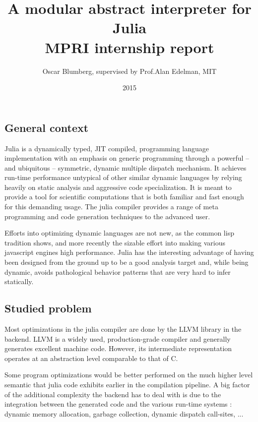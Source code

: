 \documentclass[11pt]{article}
\title{\vspace{-6ex}A modular abstract interpreter for Julia \\ MPRI internship report}
\author{Oscar Blumberg, supervised by Prof.\@ Alan Edelman, MIT}
\date{2015}
\begin{document}
\onehalfspacing
\maketitle

\thispagestyle{empty}
\vspace{1.5ex}
\subsection*{General context}

Julia\cite{julia-paper}\cite{julia-web} is a dynamically typed, JIT compiled, programming language implementation with an emphasis on generic programming through a powerful -- and ubiquitous -- symmetric, dynamic multiple dispatch mechanism. It achieves run-time performance untypical of other similar dynamic languages by relying heavily on static analysis and aggressive code specialization. It is meant to provide a tool for scientific computations that is both familiar and fast enough for this demanding usage. The julia compiler provides a range of meta programming and code generation techniques to the advanced user.

Efforts into optimizing dynamic languages are not new, as the common lisp tradition shows, and more recently the sizable effort into making various javascript engines high performance. Julia has the interesting advantage of having been designed from the ground up to be a good analysis target and, while being dynamic, avoids pathological behavior patterns that are very hard to infer statically.

\subsection*{Studied problem}

Most optimizations in the julia compiler are done by the LLVM library in the backend. LLVM is a widely used, production-grade compiler and generally generates excellent machine code. However, its intermediate representation operates at an abstraction level comparable to that of C.

Some program optimizations would be better performed on the much higher level semantic that julia code exhibits earlier in the compilation pipeline. A big factor of the additional complexity the backend has to deal with is due to the integration between the generated code and the various run-time systems : dynamic memory allocation, garbage collection, dynamic dispatch call-sites, ...
\end{document}
